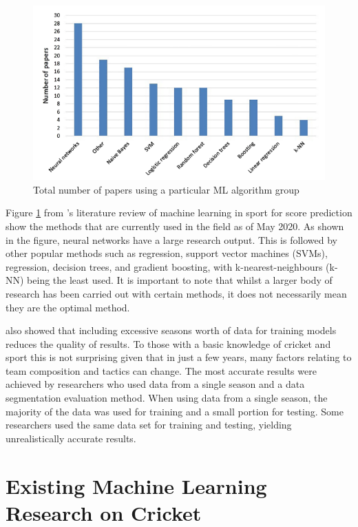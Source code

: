 \documentclass[12pt,a4paper]{report}
\theoremstyle{definition}
\begin{document}
\begin{figure}[H]
    \centering
    \includegraphics[width=\linewidth]{Horvat&Job_Figure2.png}
    \caption{Total number of papers using a particular ML algorithm group \citep{horvat2020}}
    \label{fig:NoPapers}
\end{figure}

Figure \ref{fig:NoPapers} from \citet{horvat2020}'s literature review of machine learning in sport for score prediction show the methods that are currently used in the field as of May 2020. 
As shown in the figure, neural networks have a large research output.
This is followed by other popular methods such as regression, support vector machines (SVMs), regression, decision trees, and gradient boosting, with k-nearest-neighbours (k-NN) being the least used. 
It is important to note that whilst a larger body of research has been carried out with certain methods, it does not necessarily mean they are the optimal method.

\citet{horvat2020} also showed that including excessive seasons worth of data for training models reduces the quality of results. 
To those with a basic knowledge of cricket and sport this is not surprising given that in just a few years, many factors relating to team composition and tactics can change. 
The most accurate results were achieved by researchers who used data from a single season and a data segmentation evaluation method. 
When using data from a single season, the majority of the data was used for training and a small portion for testing. 
Some researchers used the same data set for training and testing, yielding unrealistically accurate results.

\section{Existing Machine Learning Research on Cricket} \label{sec:CrickSurvey}
\end{document}
